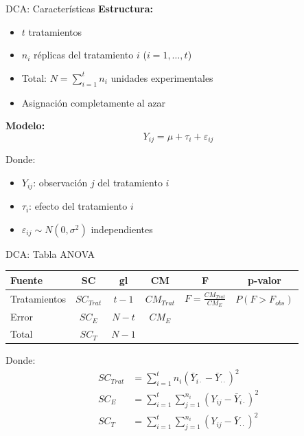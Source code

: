 \documentclass[aspectratio=169]{beamer}
\begin{document}
\begin{frame}{DCA: Características}
\textbf{Estructura:}
\begin{itemize}
\item $t$ tratamientos
\item $n_i$ réplicas del tratamiento $i$ ($i=1,\ldots,t$)
\item Total: $N = \sum_{i=1}^{t} n_i$ unidades experimentales
\item Asignación completamente al azar
\end{itemize}

\vspace{0.3cm}
\textbf{Modelo:}
$$Y_{ij} = \mu + \tau_i + \varepsilon_{ij}$$

Donde:
\begin{itemize}
\item $Y_{ij}$: observación $j$ del tratamiento $i$
\item $\tau_i$: efecto del tratamiento $i$
\item $\varepsilon_{ij} \sim N(0,\sigma^2)$ independientes
\end{itemize}
\end{frame}

\begin{frame}{DCA: Tabla ANOVA}
\begin{table}
\centering
\begin{tabular}{lccccc}
\toprule
\textbf{Fuente} & \textbf{SC} & \textbf{gl} & \textbf{CM} & \textbf{F} & \textbf{p-valor} \\
\midrule
Tratamientos & $SC_{Trat}$ & $t-1$ & $CM_{Trat}$ & $F = \frac{CM_{Trat}}{CM_E}$ & $P(F > F_{obs})$ \\[0.2cm]
Error & $SC_E$ & $N-t$ & $CM_E$ & & \\[0.2cm]
\midrule
Total & $SC_T$ & $N-1$ & & & \\
\bottomrule
\end{tabular}
\end{table}

\vspace{0.3cm}
Donde:
\begin{align*}
SC_{Trat} &= \sum_{i=1}^{t} n_i(\bar{Y}_{i\cdot} - \bar{Y}_{\cdot\cdot})^2 \\
SC_E &= \sum_{i=1}^{t}\sum_{j=1}^{n_i} (Y_{ij} - \bar{Y}_{i\cdot})^2 \\
SC_T &= \sum_{i=1}^{t}\sum_{j=1}^{n_i} (Y_{ij} - \bar{Y}_{\cdot\cdot})^2
\end{align*}
\end{frame}
\end{document}
